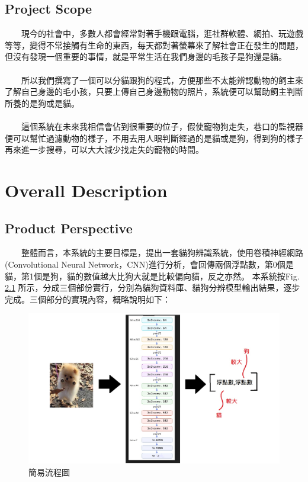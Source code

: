 \documentclass{scrreprt}
\begin{document}
\begin{CJK*}{UTF8}{bsmi}
\section{Project Scope}
　　現今的社會中，多數人都會經常對著手機跟電腦，逛社群軟體、網拍、玩遊戲等等，變得不常接觸有生命的東西，每天都對著螢幕來了解社會正在發生的問題，但沒有發現一個重要的事情，就是平常生活在我們身邊的毛孩子是狗還是貓。\\
	\\
　　所以我們撰寫了一個可以分貓跟狗的程式，方便那些不太能辨認動物的飼主來了解自己身邊的毛小孩，只要上傳自己身邊動物的照片，系統便可以幫助飼主判斷所養的是狗或是貓。\\
	\\
　　這個系統在未來我相信會佔到很重要的位子，假使寵物狗走失，巷口的監視器便可以幫忙過濾動物的樣子，不用去用人眼判斷經過的是貓或是狗，得到狗的樣子再來進一步搜尋，可以大大減少找走失的寵物的時間。\\



\chapter{Overall Description}

\section{Product Perspective}
　　整體而言，本系統的主要目標是，提出一套貓狗辨識系統，使用卷積神經網路(Convolutional Neural Network，CNN)進行分析，會回傳兩個浮點數，第0個是貓，第1個是狗，貓的數值越大比狗大就是比較偏向貓，反之亦然。
本系統按Fig.\,\ref{fig:2.1} 所示，分成三個部份實行，分別為貓狗資料庫、貓狗分辨模型輸出結果，逐步完成。三個部分的實現內容，概略說明如下：\\
\begin{figure}[h]
\begin{center}
\includegraphics[width=12.5cm]{Fig.jpg} 
\end{center} 
\label{fig:2.1} 
\caption{簡易流程圖} 
\end{figure}


\end{CJK*}
\end{document}
